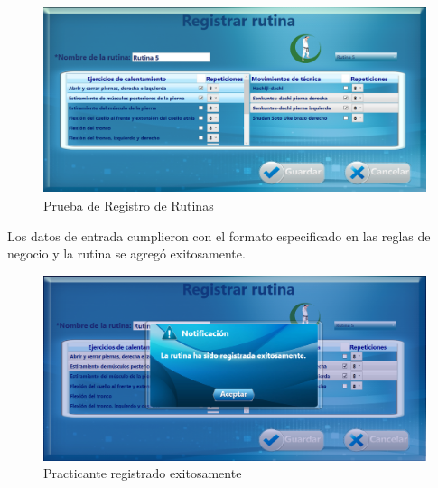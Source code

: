 \begin{figure}[H]%
	\begin{center}
		\includegraphics[scale=0.50]{./Figuras/Implementacion/Pruebas/Prueba_Registro_rutina}
	\end{center}
	\caption{Prueba de Registro de Rutinas}
	\label{fig:Prueba_Registro_rutina}
\end{figure}

Los datos de entrada cumplieron con el formato especificado en las reglas de negocio y la rutina se agregó exitosamente.
\begin{figure}[H]%
	\begin{center}
		\includegraphics[scale=0.50]{./Figuras/Implementacion/Pruebas/Prueba_Registro_rutina-mensaje}
	\end{center}
	\caption{Practicante registrado exitosamente}
	\label{fig:Prueba_Registro_rutina-mensaje}
\end{figure}

